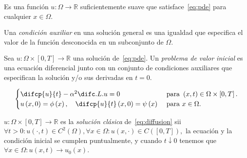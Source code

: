 \begin{definition}
    Es una función $u\colon\Omega\to\mathbb{R}$ suficientemente suave
    que satisface~\eqref{eq:pde} para cualquier $x\in\Omega$.
\end{definition}

\begin{definition}
    Una \emph{condición auxiliar} en una solución general es una
    igualdad que especifica el valor de la función desconocida en un
    subconjunto de $\Omega$.
\end{definition}

\begin{definition}
    Sea
    \begin{math}
        u\colon
        \Omega\times\left[0,T\right]
        \to\mathbb{R}
    \end{math}
    una solución de~\eqref{eq:pde}.
    Un \emph{problema de valor inicial} es una ecuación diferencial
    junto con un conjunto de condiciones auxiliares que especifican
    la solución y/o sus derivadas en $t=0$.
\end{definition}

\begin{example}
    \begin{equation}
        \begin{cases}
            \difcp{u}{t}-
            \alpha^{2}
            \difc.L.{u}{}=0 &
            \text{ para }
            \left(x,t\right)\in
            \Omega\times\left[0,T\right]. \\
            u
            \left(x,0\right)=
            \phi
            \left(x\right),\quad
            \difcp{u}{t}
            \left(x,0\right)=
            \psi
            \left(x\right)  &
            \text{ para }
            x\in\Omega.
        \end{cases}\label{eq:diffusion}
    \end{equation}
\end{example}

\begin{definition}
    \begin{math}
        u\colon
        \Omega
        \times\left[0,T\right]\to
        \mathbb{R}
    \end{math}
    es la
    \emph{solución clásica} de~\eqref{eq:diffusion} sii
    \begin{math}
        \forall t>0:
        u\left(\cdot,t\right)\in C^{2}\left(\Omega\right),
        \forall x\in\Omega:
        u\left(x,\cdot\right)\in C\left(\left[0,T\right]\right),
    \end{math}
    la ecuación y la condición inicial se cumplen puntualmente, y
    cuando $t\downarrow0$ tenemos que
    \begin{math}
        \forall x\in\Omega:
        u\left(x,t\right)\to u_{0}\left(x\right)
    \end{math}.
\end{definition}

